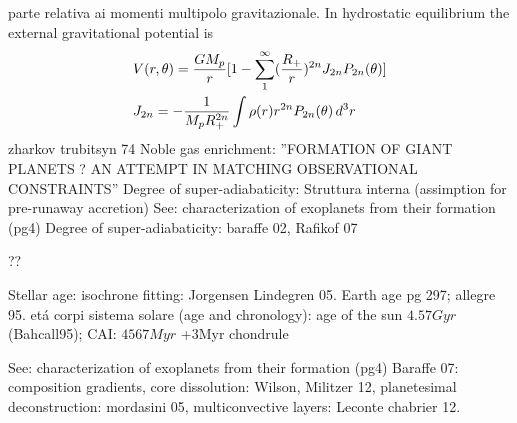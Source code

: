 
\begin{workout}
parte relativa ai momenti multipolo gravitazionale. 
In hydrostatic equilibrium the external gravitational potential is
\begin{align}
&V(r,\theta)=\frac{GM_p}{r}[1-\sum_1^{\infty}(\frac{R_+}{r})^{2n}J_{2n}P_{2n}(\theta)]\\
&J_{2n}=-\frac{1}{M_pR_+^{2n}}\int\rho(r) r^{2n}P_{2n}(\theta)\,d^3r
\end{align}
zharkov trubitsyn 74
Noble gas enrichment: ''FORMATION OF GIANT PLANETS ? AN ATTEMPT IN MATCHING OBSERVATIONAL CONSTRAINTS''
Degree of super-adiabaticity: Struttura interna (assimption for pre-runaway accretion)
See: characterization of exoplanets from their formation (pg4)
Degree of super-adiabaticity: baraffe 02, Rafikof 07
\end{workout}

\begin{workout}
??
\end{workout}

\begin{workout}[Ages]
Stellar age: isochrone fitting: Jorgensen Lindegren 05.
Earth age pg 297; allegre 95.
et\'a corpi sistema solare (age and chronology): age of the sun  $4.57Gyr$ (Bahcall95); CAI: $4567Myr$ +3Myr chondrule
\end{workout}

\begin{workout}
See: characterization of exoplanets from their formation (pg4)
Baraffe 07: composition gradients, core dissolution: Wilson, Militzer 12, planetesimal deconstruction: mordasini 05, multiconvective layers: Leconte chabrier 12.
\end{workout}

